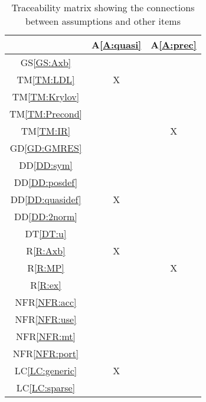 \documentclass[12pt]{article}
\newcommand{\dref}[1]{GD\ref{#1}}
\newcommand{\ddref}[1]{DD\ref{#1}}
\newcommand{\dtref}[1]{DT\ref{#1}}
\newcommand{\tref}[1]{TM\ref{#1}}
\newcommand{\aref}[1]{A\ref{#1}}
\newcommand{\gsref}[1]{GS\ref{#1}}
\newcommand{\rref}[1]{R\ref{#1}}
\newcommand{\nfrref}[1]{NFR\ref{#1}}
\newcommand{\lcref}[1]{LC\ref{#1}}
\begin{document}
\begin{table}[H]
  \centering
  \begin{tabular}{|c|c|c|}                                      \hline
                        & \aref{A:quasi} & \aref{A:prec} \\ \hline
    \gsref{GS:Axb}      &                &               \\ \hline
    \tref{TM:LDL}       & X              &               \\ \hline
    \tref{TM:Krylov}    &                &               \\ \hline
    \tref{TM:Precond}   &                &               \\ \hline
    \tref{TM:IR}        &                & X             \\ \hline
    \dref{GD:GMRES}     &                &               \\ \hline
    \ddref{DD:sym}      &                &               \\ \hline
    \ddref{DD:posdef}   &                &               \\ \hline
    \ddref{DD:quasidef} & X              &               \\ \hline
    \ddref{DD:2norm}    &                &               \\ \hline
    \dtref{DT:u}        &                &               \\ \hline
    \rref{R:Axb}        & X              &               \\ \hline
    \rref{R:MP}         &                & X             \\ \hline
    \rref{R:ex}         &                &               \\ \hline
    \nfrref{NFR:acc}    &                &               \\ \hline
    \nfrref{NFR:use}    &                &               \\ \hline
    \nfrref{NFR:mt}     &                &               \\ \hline
    \nfrref{NFR:port}   &                &               \\ \hline
    \lcref{LC:generic}  & X              &               \\ \hline
    \lcref{LC:sparse}   &                &               \\ \hline
  \end{tabular}
  \caption{Traceability matrix showing the connections between assumptions and other items}
  \label{Table:A_trace}
\end{table}
\end{document}
